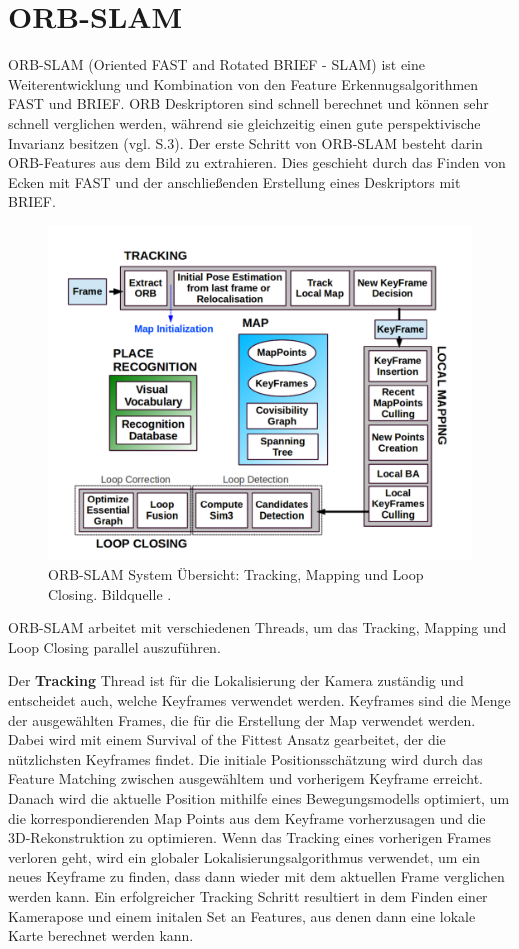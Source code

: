 \section{ORB-SLAM}

ORB-SLAM (Oriented FAST and Rotated BRIEF - SLAM) ist eine Weiterentwicklung und Kombination von den Feature Erkennugsalgorithmen FAST und BRIEF. ORB Deskriptoren sind schnell berechnet und können sehr schnell verglichen werden, während sie gleichzeitig einen gute perspektivische Invarianz besitzen (vgl. \cite{orbslam_og} S.3). Der erste Schritt von ORB-SLAM besteht darin ORB-Features aus dem Bild zu extrahieren. Dies geschieht durch das Finden von Ecken mit FAST und der anschließenden Erstellung eines Deskriptors mit BRIEF.

\begin{figure}[H]
	\centering
	\includegraphics[scale=0.6]{orb.png}
	\caption{ORB-SLAM System Übersicht: Tracking, Mapping und Loop Closing. Bildquelle \cite{orbslam_og}.}
\end{figure} 

ORB-SLAM arbeitet mit verschiedenen Threads, um das Tracking, Mapping und Loop Closing parallel auszuführen. 

Der \textbf{Tracking} Thread ist für die Lokalisierung der Kamera zuständig und entscheidet auch, welche Keyframes verwendet werden. Keyframes sind die Menge der ausgewählten Frames, die für die Erstellung der Map verwendet werden. Dabei wird mit einem \glqq Survival of the Fittest\grqq{} Ansatz gearbeitet, der die nützlichsten Keyframes findet. Die initiale Positionsschätzung wird durch das Feature Matching zwischen ausgewähltem und vorherigem Keyframe erreicht. Danach wird die aktuelle Position mithilfe eines Bewegungsmodells optimiert, um die korrespondierenden Map Points aus dem Keyframe vorherzusagen und die 3D-Rekonstruktion zu optimieren. Wenn das Tracking eines vorherigen Frames verloren geht, wird ein globaler Lokalisierungsalgorithmus verwendet, um ein neues Keyframe zu finden, dass dann wieder mit dem aktuellen Frame verglichen werden kann. Ein erfolgreicher Tracking Schritt resultiert in dem Finden einer Kamerapose und einem initalen Set an Features, aus denen dann eine lokale Karte berechnet werden kann. 


